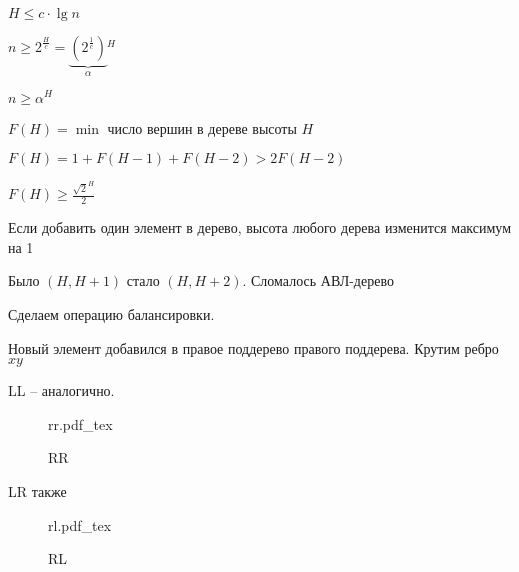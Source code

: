 \documentclass{book}
\theoremstyle{definition}
\newcommand{\incfig}[1]{%
    \def\svgwidth{\columnwidth}
    {#1.pdf_tex}
}
\begin{document}
$H\leqslant c\cdot \lg n$

$n\geqslant 2^{\frac{H}{c}} = \underbrace{\left( 2^{\frac{1}{c}} \right)}_{\alpha}{}^H $

$n\geqslant \alpha^H$

$F(H) = \min$ число вершин в дереве высоты  $H$

$F(H) = 1 + F(H-1) + F(H-2) >2F(H-2)$

$F(H) \geqslant \frac{\sqrt{2}^H}{2} $ 

\begin{statement}
    Если добавить один элемент в дерево, высота любого дерева изменится максимум на 1

\end{statement}
    Было $(H, H+1)$ стало  $(H, H+2)$. Сломалось АВЛ-дерево

Сделаем операцию балансировки.

\begin{definition}
    [RR-поворот]

    Новый элемент добавился в правое поддерево правого поддерева. Крутим ребро $xy$


LL -- аналогично.
\end{definition}
\begin{figure}[!ht]
    \centering
    \incfig{rr}
    \caption{RR}
    \label{fig:rr}
\end{figure}

\begin{definition}
    [RL]


LR также
\end{definition}
\begin{figure}[!ht]
    \scriptsize
    \centering
    \incfig{rl}
    \caption{RL}
    \label{fig:rl}
\end{figure}
\lstset{language=Java}
    
\end{document}
